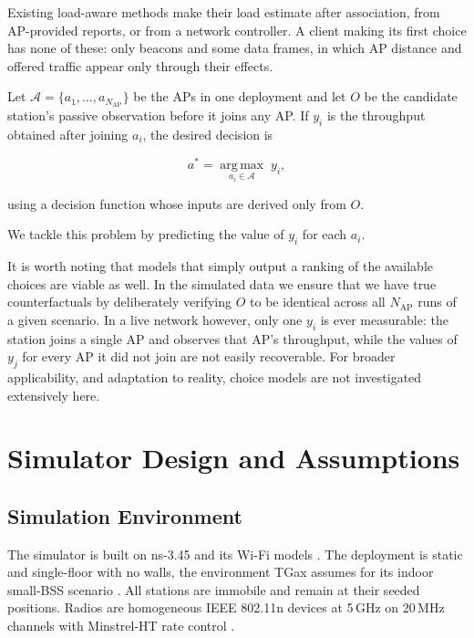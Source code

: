 \documentclass[conference]{IEEEtran}
\begin{document}
Existing load-aware methods \cite{dely2014bestap,adame2021channel} make their
load estimate after association, from AP-provided reports, or from a network
controller. A client making its first choice has none of these: only beacons
and some data frames, in which AP distance and offered traffic appear only
through their effects.

Let $\mathcal{A}=\{a_1,\ldots,a_{N_{\mathrm{AP}}}\}$ be the APs in one deployment and let $O$
be the candidate station's passive observation before it joins any AP. If
$y_i$ is the throughput obtained after joining $a_i$, the desired decision is

\begin{equation}
    a^* = \underset{a_i\in\mathcal{A}}{\operatorname{arg\,max}}\; y_i,
\end{equation}

using a decision function whose inputs are derived only from $O$. 

We tackle this problem by predicting the value of $y_i$ for each $a_i$.

It is worth noting that models that simply output a ranking of the available choices are
viable as well. In the simulated data we ensure that we have true counterfactuals 
by deliberately verifying $O$ to be identical across all $N_{\mathrm{AP}}$ runs of a given scenario. 
In a live network however, only one $y_i$ is ever measurable: the station joins a single 
AP and observes that AP's throughput, while the values of $y_j$ for every AP it did not 
join are not easily recoverable. For broader applicability, and adaptation to reality, 
choice models are not investigated extensively here.


\section{Simulator Design and Assumptions}
\label{sec:sim}


\subsection{Simulation Environment}

The simulator is built on ns-3.45 and its Wi-Fi models \cite{ns3models}.
The deployment is static and single-floor with no walls, the environment TGax
assumes for its indoor small-BSS scenario \cite{tgax2016scenarios}. 
All stations are immobile and remain at their seeded positions. 
Radios are homogeneous IEEE 802.11n devices at 5\,GHz on 20\,MHz channels 
with Minstrel-HT rate control \cite{ns3models}. 
\end{document}
